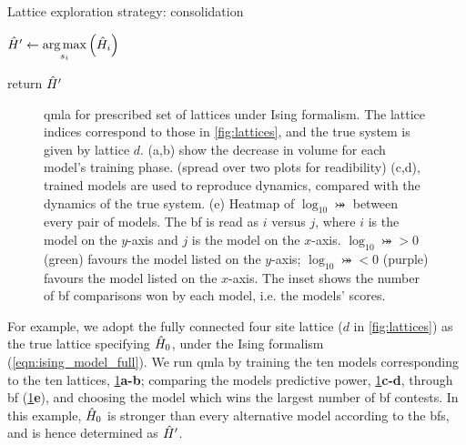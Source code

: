 \begin{algorithm}
    \caption{Lattice exploration strategy: consolidation}
    \label{alg:lattice_exploration_strategy_consolidation}
    \DontPrintSemicolon

    \;


    $\hat{H}^{\prime} \gets \operatorname*{arg\,max}\limits_{s_i} \left(\hat{H}_i\right)$

    return $\hat{H}^{\prime}$
\end{algorithm}


\begin{figure}
    \caption[\gls{qmla} for prescribed set of lattices under Ising formalism]{
        \gls{qmla} for prescribed set of lattices under Ising formalism. 
        The lattice indices correspond to those in \cref{fig:lattices}, 
            and the true system is given by lattice $d$. 
        (a,b) show the decrease in \gls{volume} for each model's training phase. (spread over two plots for readibility) 
        (c,d), trained models are used to reproduce dynamics, compared with the dynamics of the
            true system. 
        (e) Heatmap of $\log_{10} \bij$ between every pair of models. The \gls{bf} is read as 
        $i$ versus $j$, where $i$ is the model on the $y$-axis and $j$ is the model on the $x$-axis. 
        $\log_{10} \bij > 0$ (green) favours the model listed on the $y$-axis;
        $\log_{10} \bij < 0$ (purple) favours the model listed on the $x$-axis.
        The inset shows the number of \gls{bf} comparisons won by each model, i.e. the models' scores. 
        \figtableref
    }
    \label{fig:lattice_qmla_eg}
\end{figure}    

For example, we adopt the fully connected four site lattice ($d$ in \cref{fig:lattices})
    as the true lattice specifying $\hat{H}_0$, under the Ising formalism (\cref{eqn:ising_model_full}).
We run \gls{qmla} by training the ten models corresponding to the ten lattices,  \cref{fig:lattice_qmla_eg}\textbf{a-b};
    comparing the models predictive power, \cref{fig:lattice_qmla_eg}\textbf{c-d},
    through \gls{bf} (\cref{fig:lattice_qmla_eg}\textbf{e}), 
    and choosing the model which wins the largest number of \gls{bf} contests. 
In this example, $\hat{H}_0$ is stronger than every alternative model according to the \glspl{bf}, 
    and is hence determined as $\hat{H}^{\prime}$. 


